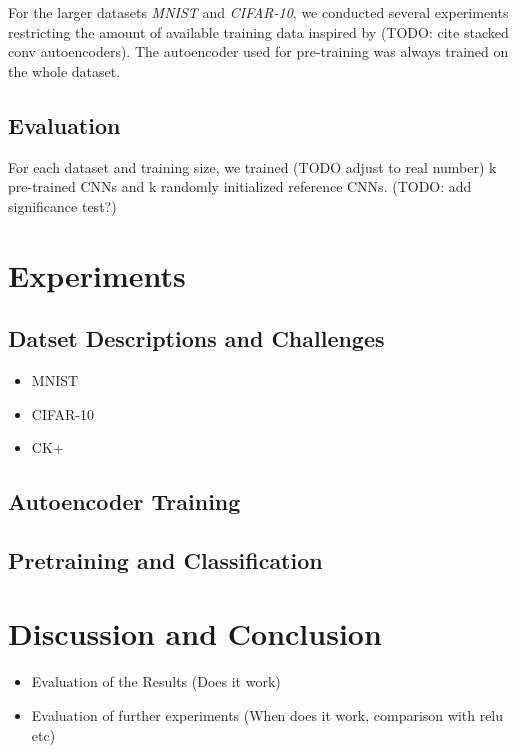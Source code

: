 \documentclass[draft]{article}
\begin{document}
    For the larger datasets \emph{MNIST} and \emph{CIFAR-10}, we conducted several experiments restricting the amount of available training data inspired by (TODO: cite stacked conv autoencoders). The autoencoder used for pre-training was always trained on the whole dataset. 


  \subsection{Evaluation}
    For each dataset and training size, we trained (TODO adjust to real number) k pre-trained CNNs and k randomly initialized reference CNNs. (TODO: add significance test?)
  

\section{Experiments}

  \subsection{Datset Descriptions and Challenges}

    \begin{itemize}
    \item{MNIST}
    \item{CIFAR-10}
    \item{CK+}
    \end{itemize}

  \subsection{Autoencoder Training}
  \subsection{Pretraining and Classification}

\section{Discussion and Conclusion}
  
  \begin{itemize}

    \item Evaluation of the Results         (Does it work)
    \item Evaluation of further experiments (When does it work, comparison with relu etc)

  \end{itemize}
\end{document}
